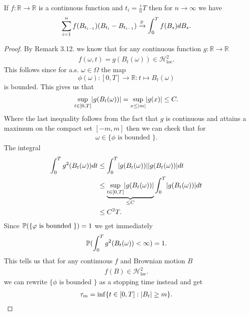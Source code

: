 \begin{Theorem}
 If $f : \mathbb{R} \to \mathbb{R} $  is a continuous function and  $t_i = \frac{i}{n}T$ then for $n\to \infty$ we have
 \begin{align*}
   \sum_{i=1}^{n} f(B_{t_{i-1}})(B_{t_i}-B_{t_{i-1}}) \xrightarrow{\P} \int_0^{T} f(B_s) dB_s
 .\end{align*}
\end{Theorem}
\begin{proof}
By Remark 3.12. we know that for any continuous function $g : \mathbb{R} \to  \mathbb{R}$ 
\begin{align*}
  f(\omega ,t) = g(B_t(\omega )) \in  \mathcal{H}^{2}_{\text{loc}} 
.\end{align*}
This follows since for a.s. $\omega  \in  \Omega $ the map 
\[\phi(\omega ) : [0,T] \to  \mathbb{R} : t \mapsto B_t(\omega )\]
is bounded. This gives us that 
\begin{align*}
  \sup_{t \in  [0,T]} \abs{g(B_t(\omega ))} = \sup_{x \le \abs{m}} \abs{g(x)} \le  C
.\end{align*}
Where the last inequality follows from the fact that $g$ is continuous and attains a maximum on the compact set $[-m,m]$ then we can check that 
for 
\begin{align*}
  \omega  \in  \{\phi \text{ is bounded } \}  
.\end{align*}
The integral 
\begin{align*}
  \int_0^{T}  g^2(B_t(\omega )) dt &\le  \int_0^{T}  \abs{g(B_t(\omega ))}\abs{g(B_t(\omega ))} dt\\
                                   &\le  \underbrace{\sup_{t \in [0,T]} \abs{g(B_t(\omega ))}}_{\le C} \int_0^{T}  \abs{g(B_t(\omega ))} dt\\
                                   &\le  C^2T
.\end{align*}
Since $\P(\{\phi \text{ is bounded } \}) = 1$ we get  immediately 
\begin{align*}
  \P(\int_0^{T} g^2(B_t(\omega ))  < \infty) = 1
.\end{align*}
This tells us that  for any continuous $f$ and Brownian motion $B$ 
\begin{align*}
  f(B) \in  \mathcal{H}_{\text{loc}}^2
.\end{align*}
we can rewrite $\{\phi \text{ is bounded } \}$ as a stopping time instead and get 
\begin{align*}
  \tau_m = \inf \{t \in [0,T] :  \abs{B_t} \ge  m\}  
.\end{align*}

\end{proof}
